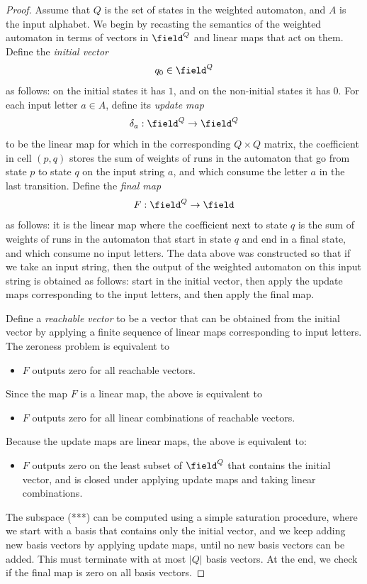 \begin{proof} Assume that $Q$ is the set of states in the weighted automaton, and $A$ is the input alphabet. We begin by recasting the semantics of the weighted automaton in terms of vectors in $\field^Q$ and linear maps that act on them.  Define the \emph{initial vector}
    \begin{align*}
    q_0 \in \field^Q
    \end{align*}
    as follows: on the initial states it has $1$, and on the non-initial states it has $0$. For each input letter $a \in A$, define its   \emph{update  map}
    \begin{align*}
    \delta_a : \field^Q \to \field^Q
    \end{align*}
    to be the linear map for which  in the corresponding $Q \times Q$ matrix, the coefficient in cell $(p,q)$ stores the sum of weights of runs in the automaton that go from state $p$ to state $q$ on the input string $a$, and which consume the letter $a$ in the last transition. Define the \emph{final map}
    \begin{align*}
    F : \field^Q \to \field
    \end{align*}
    as follows: it is the  linear map where  the coefficient  next to state $q$ is the sum of weights of runs in the automaton that start in state $q$ and end in a final state, and which consume no input letters. The data above was constructed so that if we take an input string, then the output of the weighted automaton on this input string is obtained as follows: start in the initial vector, then apply the update maps corresponding to the input letters, and then apply the final map.

    Define a \emph{reachable vector} to be a vector that can be obtained from the initial vector by applying a finite sequence of linear maps corresponding to input letters. The zeroness problem is equivalent to 
    \begin{itemize}
        \item[(*)] $F$ outputs zero for all reachable vectors.
    \end{itemize}
    Since the map $F$ is a linear map, the above is equivalent to
\begin{itemize}
    \item[(**)] $F$ outputs zero for all linear combinations of reachable vectors.
\end{itemize}
Because the update maps  are linear maps, the above is equivalent to:
\begin{itemize}
    \item[(***)] $F$ outputs zero on the least subset of $\field^Q$ that contains the initial vector, and is closed under applying update maps and taking linear combinations.
\end{itemize}
The subspace (***) can be computed using a simple saturation procedure, where we start with a basis that contains only the initial vector, and we keep adding new basis vectors by applying update maps, until no new basis vectors can be added. This must terminate with at most $|Q|$ basis vectors. At the end, we check if the final map is zero on all basis vectors.  
\end{proof}
